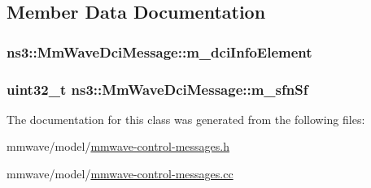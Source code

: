 \subsection{Member Data Documentation}
\subsubsection[{\texorpdfstring{m\+\_\+dci\+Info\+Element}{m_dciInfoElement}}]{ ns3\+::\+Mm\+Wave\+Dci\+Message\+::m\+\_\+dci\+Info\+Element\hspace{0.3cm}{\ttfamily [private]}}\hypertarget{classns3_1_1MmWaveDciMessage_a1a940eabd5248a790d2a932f0bc6e03c}{}\label{classns3_1_1MmWaveDciMessage_a1a940eabd5248a790d2a932f0bc6e03c}
\subsubsection[{\texorpdfstring{m\+\_\+sfn\+Sf}{m_sfnSf}}]{\setlength{\rightskip}{0pt plus 5cm}uint32\+\_\+t ns3\+::\+Mm\+Wave\+Dci\+Message\+::m\+\_\+sfn\+Sf\hspace{0.3cm}{\ttfamily [private]}}\hypertarget{classns3_1_1MmWaveDciMessage_aff0401c8bf30ba42a46fc369a32b0ce2}{}\label{classns3_1_1MmWaveDciMessage_aff0401c8bf30ba42a46fc369a32b0ce2}


The documentation for this class was generated from the following files\+:\begin{DoxyCompactItemize}
\item 
mmwave/model/\hyperlink{mmwave-control-messages_8h}{mmwave-\/control-\/messages.\+h}\item 
mmwave/model/\hyperlink{mmwave-control-messages_8cc}{mmwave-\/control-\/messages.\+cc}\end{DoxyCompactItemize}
